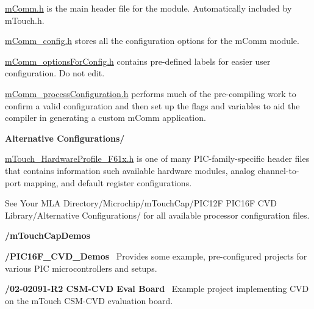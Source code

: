 \begin{DoxyItemize}
\begin{DoxyItemize}
\begin{DoxyItemize}
\begin{DoxyItemize}
\begin{DoxyItemize}
\item \hyperlink{m_comm_8h}{m\+Comm.\+h} is the main header file for the module. Automatically included by m\+Touch.\+h. 
\item \hyperlink{m_comm__config_8h}{m\+Comm\+\_\+config.\+h} stores all the configuration options for the m\+Comm module. 
\item \hyperlink{m_comm__options_for_config_8h}{m\+Comm\+\_\+options\+For\+Config.\+h} contains pre-\/defined labels for easier user configuration. Do not edit. 
\item \hyperlink{m_comm__process_configuration_8h}{m\+Comm\+\_\+process\+Configuration.\+h} performs much of the pre-\/compiling work to confirm a valid configuration and then set up the flags and variables to aid the compiler in generating a custom m\+Comm application. 
\end{DoxyItemize}
\item {\bfseries Alternative Configurations/} 
\begin{DoxyItemize}
\item \hyperlink{m_touch__hardware_profile__12_f61x_8h}{m\+Touch\+\_\+\+Hardware\+Profile\+\_\+F61x.\+h} is one of many P\+I\+C-\/family-\/specific header files that contains information such available hardware modules, analog channel-\/to-\/port mapping, and default register configurations. 
\item See {\ttfamily Your M\+L\+A Directory/\+Microchip/m\+Touch\+Cap/\+P\+I\+C12\+F P\+I\+C16\+F C\+V\+D Library/\+Alternative Configurations/} for all available processor configuration files. 
\end{DoxyItemize}
\end{DoxyItemize}
\end{DoxyItemize}
\end{DoxyItemize}
\item {\bfseries /m\+Touch\+Cap\+Demos} 
\begin{DoxyItemize}
\item {\bfseries /\+P\+I\+C16\+F\+\_\+\+C\+V\+D\+\_\+\+Demos}~\newline
 Provides some example, pre-\/configured projects for various P\+I\+C microcontrollers and setups. 
\begin{DoxyItemize}
\item {\bfseries /02-\/02091-\/\+R2 C\+S\+M-\/\+C\+V\+D Eval Board}~\newline
 Example project implementing C\+V\+D on the m\+Touch C\+S\+M-\/\+C\+V\+D evaluation board. 

\end{DoxyItemize}
\end{DoxyItemize}
\end{DoxyItemize}
